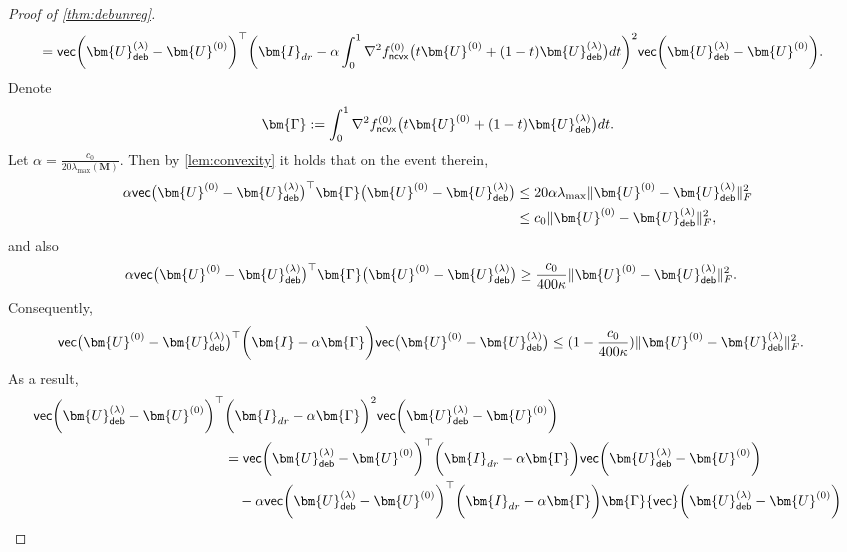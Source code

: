 \documentclass[10pt]{article}
\renewcommand{\t}{^{\top}}
\theoremstyle{definition}
\begin{document}
\begin{proof}[Proof of \cref{thm:debunreg}]
\begin{align}
 &= {\sf vec} \bigg( \bm{U}_{{\sf deb}}^{(\lambda)} - \bm{U}^{(0)} \bigg)\t \bigg( \bm{I}_{dr} - \alpha \int_{0}^{1} \nabla^2 f^{(0)}_{{\sf ncvx}}\big( t \bm{U}^{(0)} + (1 - t) \bm{U}^{(\lambda)}_{{\sf deb}} \big) dt \bigg)^2 {\sf vec}\bigg( \bm{U}_{{\sf deb}}^{(\lambda)} - \bm{U}^{(0)} \bigg).
\end{align}
Denote 
\begin{align}
    \bm{\Gamma} := \int_{0}^{1} \nabla^2 f^{(0)}_{{\sf ncvx}}\big( t \bm{U}^{(0)} + (1 - t) \bm{U}^{(\lambda)}_{{\sf deb}} \big) dt .
\end{align}
Let $\alpha = \frac{c_0}{20\lambda_{\max}(\bm{M})}$.  Then by \cref{lem:convexity} it holds that on the event therein,
\begin{align}
    \alpha {\sf vec}\big( \bm{U}^{(0)} - \bm{U}_{{\sf deb}}^{(\lambda)}\big)\t \bm{\Gamma} \big( \bm{U}^{(0)} - \bm{U}_{{\sf deb}}^{(\lambda)}\big) &\leq 20 \alpha  \lambda_{\max} \| \bm{U}^{(0)} - \bm{U}_{{\sf deb}}^{(\lambda)} \|_F^2 \\
    &\leq c_0 \| \bm{U}^{(0)} - \bm{U}_{{\sf deb}}^{(\lambda)} \|_F^2,
\end{align}
and also
\begin{align}
       \alpha {\sf vec}\big( \bm{U}^{(0)} - \bm{U}_{{\sf deb}}^{(\lambda)}\big)\t \bm{\Gamma} \big( \bm{U}^{(0)} - \bm{U}_{{\sf deb}}^{(\lambda)}\big) &\geq \frac{c_0}{400 \kappa} \| \bm{U}^{(0)} - \bm{U}_{{\sf deb}}^{(\lambda)} \|_F^2.
\end{align}
Consequently,
\begin{align}
    {\sf vec}\big( \bm{U}^{(0)} - \bm{U}_{{\sf deb}}^{(\lambda)}\big)\t \bigg( \bm{I} - \alpha \bm{\Gamma} \bigg) {\sf vec}\big( \bm{U}^{(0)} - \bm{U}_{{\sf deb}}^{(\lambda)}\big) &\leq (1 - \frac{c_0}{400 \kappa} ) \| \bm{U}^{(0)} - \bm{U}_{{\sf deb}}^{(\lambda)} \|_F^2.
\end{align}
As a result,
\begin{align}
    {\sf vec} \bigg( \bm{U}_{{\sf deb}}^{(\lambda)} - \bm{U}^{(0)} \bigg)\t& \bigg( \bm{I}_{dr} - \alpha \bm{\Gamma} \bigg)^2 {\sf vec}\bigg( \bm{U}_{{\sf deb}}^{(\lambda)} - \bm{U}^{(0)} \bigg) \\
    &= {\sf vec} \bigg( \bm{U}_{{\sf deb}}^{(\lambda)} - \bm{U}^{(0)} \bigg)\t \bigg( \bm{I}_{dr} - \alpha \bm{\Gamma} \bigg) {\sf vec}\bigg( \bm{U}_{{\sf deb}}^{(\lambda)} - \bm{U}^{(0)} \bigg) \\
    &\quad - \alpha {\sf vec} \bigg( \bm{U}_{{\sf deb}}^{(\lambda)} - \bm{U}^{(0)} \bigg)\t \bigg( \bm{I}_{dr} - \alpha \bm{\Gamma} \bigg)\bm{\Gamma} {\sf vec}\bigg( \bm{U}_{{\sf deb}}^{(\lambda)} - \bm{U}^{(0)} \bigg) \\

\end{align}
\end{proof}
\end{document}
